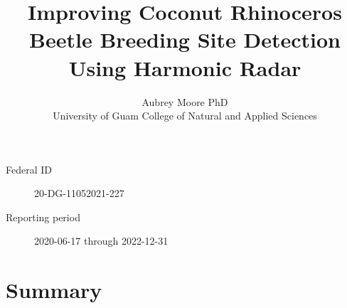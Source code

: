 \documentclass[12pt,letterpaper,english,bibliography=totocnumbered, abstract=on]{scrartcl}
\begin{document}
\titlehead{Final Report: USFS 20-DG-11052021-227}

\title{Improving Coconut Rhinoceros Beetle Breeding Site Detection Using Harmonic Radar}

\author{Aubrey Moore PhD\\University of Guam College of Natural and Applied Sciences}


\maketitle

\begin{description}
	\item[Federal ID] 20-DG-11052021-227
	\item[Reporting period] 2020-06-17 through 2022-12-31
\end{description}



\clearpage

\tableofcontents

\clearpage

\section*{Summary}
\noindent
	
\end{document}
